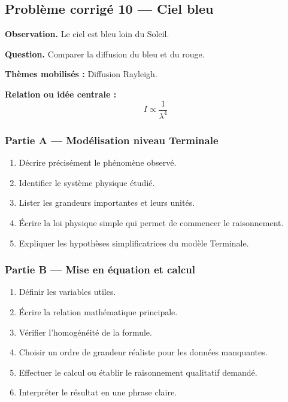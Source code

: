 \documentclass[11pt,a4paper]{article}
\begin{document}
\subsection{Problème corrigé 10 — Ciel bleu}

\begin{exercicebox}
\textbf{Observation.} Le ciel est bleu loin du Soleil.

\medskip
\textbf{Question.} Comparer la diffusion du bleu et du rouge.

\medskip
\textbf{Thèmes mobilisés :} Diffusion Rayleigh.

\medskip
\textbf{Relation ou idée centrale :}
\[
I\propto\frac1{\lambda^4}
\]
\end{exercicebox}

\subsubsection*{Partie A — Modélisation niveau Terminale}

\begin{enumerate}
  \item Décrire précisément le phénomène observé.
  \item Identifier le système physique étudié.
  \item Lister les grandeurs importantes et leurs unités.
  \item Écrire la loi physique simple qui permet de commencer le raisonnement.
  \item Expliquer les hypothèses simplificatrices du modèle Terminale.
\end{enumerate}

\subsubsection*{Partie B — Mise en équation et calcul}

\begin{enumerate}
  \item Définir les variables utiles.
  \item Écrire la relation mathématique principale.
  \item Vérifier l'homogénéité de la formule.
  \item Choisir un ordre de grandeur réaliste pour les données manquantes.
  \item Effectuer le calcul ou établir le raisonnement qualitatif demandé.
  \item Interpréter le résultat en une phrase claire.
\end{enumerate}
\end{document}
